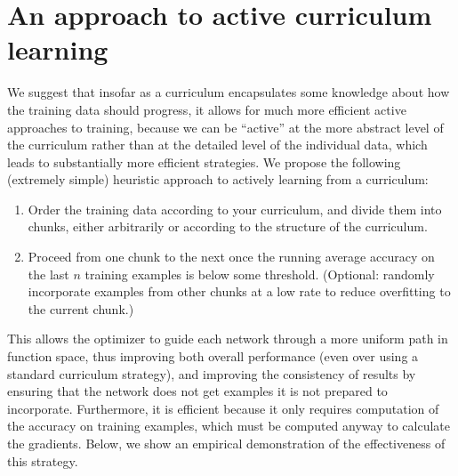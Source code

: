 \documentclass{article}
\begin{document}
\section{An approach to active curriculum learning}
We suggest that insofar as a curriculum encapsulates some knowledge about how the training data should progress, it allows for much more efficient active approaches to training, because we can be ``active'' at the more abstract level of the curriculum rather than at the detailed level of the individual data, which leads to substantially more efficient strategies. We propose the following (extremely simple) heuristic approach to actively learning from a curriculum:
\vspace{-0.5em}
\begin{enumerate}
\setlength\itemsep{0em}
\item Order the training data according to your curriculum, and divide them into chunks, either arbitrarily or according to the structure of the curriculum.
\item Proceed from one chunk to the next once the running average accuracy on the last $n$ training examples is below some threshold. (Optional: randomly incorporate examples from other chunks at a low rate to reduce overfitting to the current chunk.)%

\end{enumerate} 
\vspace{-0.5em}
This allows the optimizer to guide each network through a more uniform path in function space, thus improving both overall performance (even over using a standard curriculum strategy), and improving the consistency of results by ensuring that the network does not get examples it is not prepared to incorporate. Furthermore, it is efficient because it only requires computation of the accuracy on training examples, which must be computed anyway to calculate the gradients. Below, we show an empirical demonstration of the effectiveness of this strategy.
\end{document}

